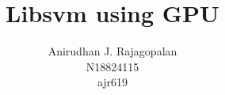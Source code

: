 \documentclass{article}
\begin{document}
\title{Libsvm using GPU}
\author{Anirudhan J. Rajagopalan \\ N18824115 \\ ajr619}
\maketitle



\end{document}
